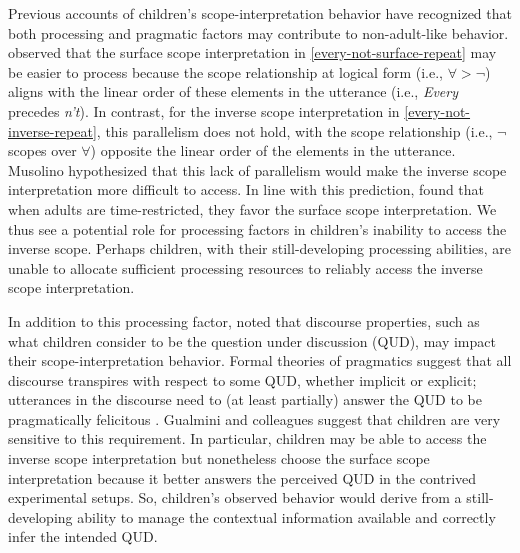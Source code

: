 \documentclass[preprint,authoryear]{elsarticle}\frenchspacing
\begin{document}
Previous accounts of children's scope-interpretation behavior have recognized that both processing and pragmatic factors may contribute to non-adult-like behavior. \cite{musolino1998,musolino2006structure} observed that the surface scope interpretation in \ref{every-not-surface-repeat} may be easier to process because the scope relationship at logical form (i.e., $\forall > \neg$) aligns with the  linear order of these elements in the utterance (i.e., \textit{Every} precedes \textit{n't}). In contrast, for the inverse scope interpretation in \ref{every-not-inverse-repeat}, this parallelism does not hold,  with the scope relationship (i.e., $\neg$ scopes over $\forall$) opposite the linear order of the elements in the utterance. Musolino hypothesized that this lack of parallelism would make the inverse scope interpretation more difficult to access. In line with this prediction, \cite{conroyetal2008} found that when adults are time-restricted, they favor the surface scope interpretation. We thus see a potential role for processing factors in children's inability to access the inverse scope. Perhaps children, with their still-developing processing abilities, are unable to allocate sufficient processing resources to reliably access the inverse scope interpretation.

In addition to this processing factor, \cite{gualmini2008question} noted that discourse properties, such as what children consider to be the question under discussion (QUD), may impact their scope-interpretation behavior.  Formal theories of pragmatics suggest that all discourse transpires with respect to some QUD, whether implicit or explicit; utterances in the discourse need to (at least partially) answer the QUD to be pragmatically felicitous \citep{roberts2012information}. Gualmini and colleagues \citep{hulsey2004question, gualmini2008question} suggest that children are very sensitive to this requirement. In particular, children may be able to access the inverse scope interpretation but nonetheless choose the surface scope interpretation because it better answers the perceived QUD in the contrived experimental setups. So, children's observed behavior would derive from a still-developing ability to manage the contextual information available and correctly infer the intended QUD.
\end{document}
